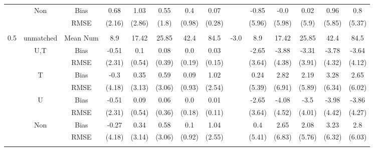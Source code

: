 \begin{tabular}{@{\extracolsep{5pt}}lc|cccccc|lccccc}
 & Non & Bias & 0.68 & 1.03 & 0.55 & 0.4 & 0.07 &  & -0.85 & -0.0 & 0.02 & 0.96 & 0.8 \\
 &  & RMSE & (2.16) & (2.86) & (1.8) & (0.98) & (0.28) &  & (5.96) & (5.98) & (5.9) & (5.85) & (5.37) \\
 &  &  &  &  &  &  &  &  &  &  &  &  &  \\
0.5 & unmatched & Mean Num & 8.9 & 17.42 & 25.85 & 42.4 & 84.5 & -3.0 & 8.9 & 17.42 & 25.85 & 42.4 & 84.5 \\
 & U,T & Bias & -0.51 & 0.1 & 0.08 & 0.0 & 0.03 &  & -2.65 & -3.88 & -3.31 & -3.78 & -3.64 \\
 &  & RMSE & (2.31) & (0.54) & (0.39) & (0.19) & (0.15) &  & (3.64) & (4.38) & (3.91) & (4.32) & (4.12) \\
 & T & Bias & -0.3 & 0.35 & 0.59 & 0.09 & 1.02 &  & 0.24 & 2.82 & 2.19 & 3.28 & 2.65 \\
 &  & RMSE & (4.18) & (3.13) & (3.06) & (0.93) & (2.54) &  & (5.39) & (6.91) & (5.89) & (6.34) & (6.02) \\
 & U & Bias & -0.51 & 0.09 & 0.06 & 0.0 & 0.01 &  & -2.65 & -4.08 & -3.5 & -3.98 & -3.86 \\
 &  & RMSE & (2.31) & (0.54) & (0.36) & (0.18) & (0.11) &  & (3.64) & (4.52) & (4.01) & (4.42) & (4.27) \\
 & Non & Bias & -0.27 & 0.34 & 0.58 & 0.1 & 1.04 &  & 0.4 & 2.65 & 2.08 & 3.23 & 2.8 \\
 &  & RMSE & (4.18) & (3.14) & (3.06) & (0.92) & (2.55) &  & (5.41) & (6.83) & (5.76) & (6.32) & (6.03) \\
 &  &  &  &  &  &  &  &  &  &  &  &  &  \\
\hline 
\bottomrule 
\end{tabular}
